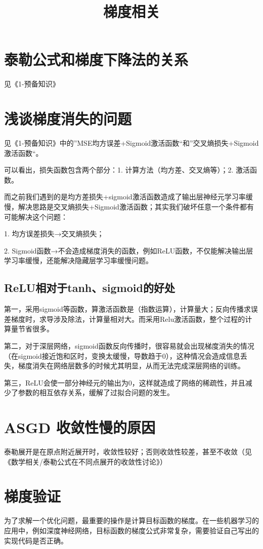\documentclass[12pt]{article}
\title{梯度相关}
\begin{document}
\maketitle
\tableofcontents

\section{泰勒公式和梯度下降法的关系}
见《1-预备知识》

\section{浅谈梯度消失的问题\cite{Commonly_Loss_Functions}}
见《1-预备知识》中的”MSE均方误差+Sigmoid激活函数“和”交叉熵损失+Sigmoid激活函数“。

可以看出，损失函数包含两个部分：1. 计算方法（均方差、交叉熵等）；2. 激活函数。

而之前我们遇到的是均方差损失+sigmoid激活函数造成了输出层神经元学习率缓慢，解决思路是交叉熵损失+Sigmoid激活函数；其实我们破坏任意一个条件都有可能解决这个问题：

1. 均方误差损失→交叉熵损失；

2. Sigmoid函数→不会造成梯度消失的函数，例如ReLU函数，不仅能解决输出层学习率缓慢，还能解决隐藏层学习率缓慢问题。

\subsection{ReLU相对于tanh、sigmoid的好处}
第一，采用sigmoid等函数，算激活函数是（指数运算），计算量大；反向传播求误差梯度时，求导涉及除法，计算量相对大。而采用Relu激活函数，整个过程的计算量节省很多。

第二，对于深层网络，sigmoid函数反向传播时，很容易就会出现梯度消失的情况（在sigmoid接近饱和区时，变换太缓慢，导数趋于0），这种情况会造成信息丢失，梯度消失在网络层数多的时候尤其明显，从而无法完成深层网络的训练。

第三，ReLU会使一部分神经元的输出为0，这样就造成了网络的稀疏性，并且减少了参数的相互依存关系，缓解了过拟合问题的发生。

\section{ASGD 收敛性慢的原因}
泰勒展开是在原点附近展开时，收敛性较好；否则收敛性较差，甚至不收敛（见《数学相关/泰勒公式在不同点展开的收敛性讨论》）

\section{梯度验证\cite{Verify_Gradient}}
为了求解一个优化问题，最重要的操作是计算目标函数的梯度。在一些机器学习的应用中，例如深度神经网络，目标函数的梯度公式非常复杂，需要验证自己写出的实现代码是否正确。
\end{document}
